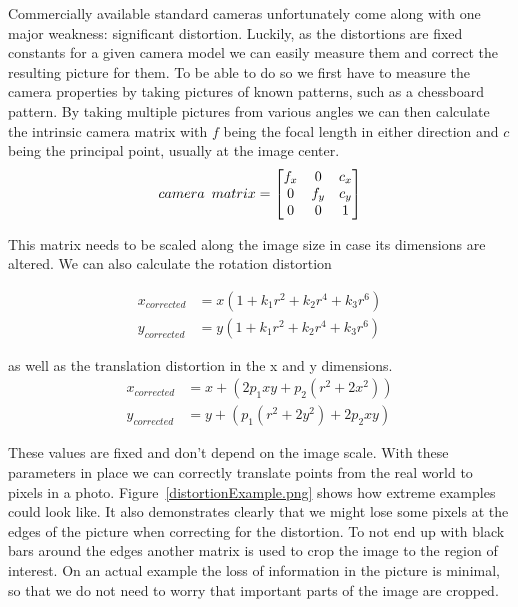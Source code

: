 Commercially available standard cameras unfortunately come along with one major weakness: significant distortion.
Luckily, as the distortions are fixed constants for a given camera model we can easily measure them and correct the resulting picture for them.
To be able to do so we first have to measure the camera properties by taking pictures of known patterns, such as a chessboard pattern.
By taking multiple pictures from various angles we can then calculate the intrinsic camera matrix with $f$ being the focal length in either direction and $c$ being the principal point, usually at the image center.
\[
    camera \hspace{5px}matrix =
    \begin{bmatrix}
        f_{x} & 0 & c_{x} \\
        0 & f_{y} & c_{y} \\
        0 & 0 & 1
    \end{bmatrix}
\]

This matrix needs to be scaled along the image size in case its dimensions are altered.
We can also calculate the rotation distortion

\begin{align*}
    x_{corrected} &= x(1 + k_{1}r^{2} + k_{2}r^{4} + k_{3}r^{6}) \\
    y_{corrected} &= y(1 + k_{1}r^{2} + k_{2}r^{4} + k_{3}r^{6})
\end{align*}

as well as the translation distortion in the x and y dimensions.
\begin{align*}
    x_{corrected} &= x + (2p_{1}xy + p_{2}(r^{2} + 2x^{2})) \\
    y_{corrected} &= y + (p_{1} (r^{2} + 2y^{2}) + 2p_{2}xy)
\end{align*}

These values are fixed and don't depend on the image scale.
With these parameters in place we can correctly translate points from the real world to pixels in a photo.
Figure~\ref{distortionExample.png} shows how extreme examples could look like.
It also demonstrates clearly that we might lose some pixels at the edges of the picture when correcting for the distortion.
To not end up with black bars around the edges another matrix is used to crop the image to the region of interest.
On an actual example the loss of information in the picture is minimal, so that we do not need to worry that important parts of the image are cropped.

